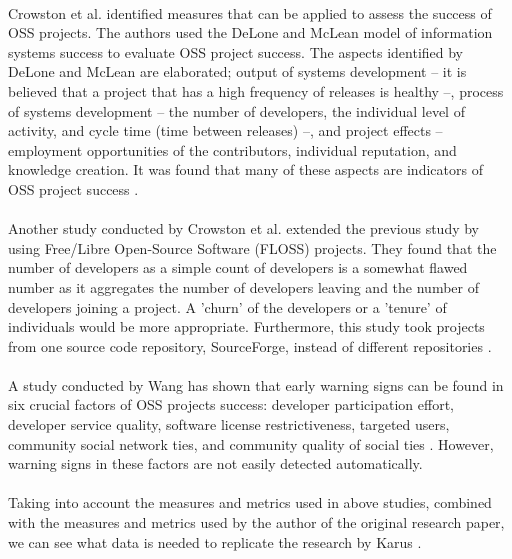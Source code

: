 \paragraph{}
Crowston et al. identified measures that can be applied to assess the success of
OSS projects. The authors used the DeLone and McLean model of information
systems success to evaluate OSS project success. The aspects identified by
DeLone and McLean are elaborated; output of systems development -- it is
believed that a project that has a high frequency of releases is healthy --,
process of systems development -- the number of developers, the individual
level of activity, and cycle time (time between releases) --, and
project effects -- employment opportunities of the contributors, individual
reputation, and knowledge creation. It was found that many of these aspects are
indicators of OSS project success \cite{crowston2003}.

\paragraph{}
Another study conducted by Crowston et al. extended the previous study by using
Free/Libre Open-Source Software (FLOSS) projects. They found that the number of
developers as a simple count of developers is a somewhat flawed number as
it aggregates the number of developers leaving and the number of developers
joining a project. A 'churn' of the developers or a 'tenure' of individuals
would be more appropriate.
Furthermore, this study took projects from one source code repository,
SourceForge, instead of different repositories \cite{crowston2006}.

\paragraph{}
A study conducted by Wang has shown that early warning signs can be found in
six crucial factors of OSS projects success: developer participation effort,
developer service quality, software license restrictiveness, targeted users,
community social network ties, and community quality of social ties
\cite{wang2012}.
However, warning signs in these factors are not easily detected automatically.

\paragraph{}
Taking into account the measures and metrics used in above studies, combined
with the measures and metrics used by the author of the original research paper,
we can see what data is needed to replicate the research by Karus
\cite{karus2013}.


